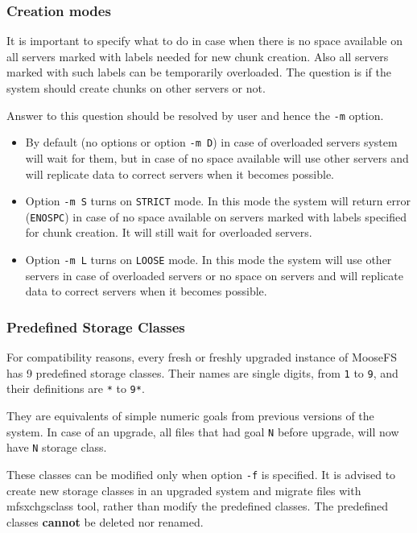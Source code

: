\documentclass[a4paper,11pt,english]{report}
\def\code#1{\texttt{#1}}
\begin{document}
				\subsubsection{Creation modes}
					It is important to specify what to do in case when there is no space available on all servers marked with labels needed for new chunk creation. Also all servers marked with such labels can be temporarily overloaded.  The question is if the system should create chunks on other servers or not.
					
					Answer to this question should be resolved by user and hence the \code{-m} option.
				
					\begin{itemize}
						\item By default (no options or option \code{-m D}) in case of overloaded servers system will wait for them, but in case of no space available will use other servers and will replicate data to correct servers when it becomes possible.
				
						\item Option \code{-m S} turns on \code{STRICT} mode. In this mode the system will return error (\code{ENOSPC}) in case of no space available on servers marked with labels specified for chunk creation. It will still wait for overloaded servers.
				
						\item Option \code{-m L} turns on \code{LOOSE} mode. In this mode the system will use other servers in case of overloaded servers or no space on servers and will replicate data to correct servers when it becomes possible.
					\end{itemize}
				
				\subsubsection{Predefined Storage Classes}
					\label{section:predefined-storage-classes}
					For  compatibility  reasons,  every  fresh  or  freshly upgraded instance of MooseFS has 9 predefined storage classes. Their names are single digits, from \code{1} to \code{9}, and their definitions are \code{*} to \code{9*}.
					
					They are equivalents of simple numeric goals from previous versions of the system. In case of an upgrade, all files that had goal \code{N} before upgrade, will now have \code{N} storage class.
					
					These classes can be modified only when option \code{-f} is specified. It is advised to create new storage classes in an upgraded system and migrate files with mfsxchgsclass tool, rather than modify the  predefined classes. The predefined classes \textbf{cannot} be deleted nor renamed.
			
\end{document}
